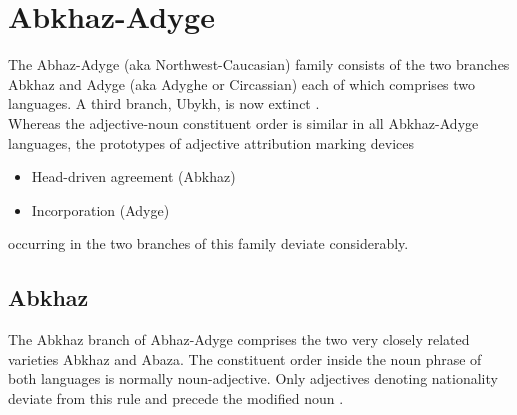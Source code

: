 \section{Abkhaz-Adyge}
The Abhaz-Adyge (aka Northwest-Caucasian) family consists of the two branches Abkhaz and Adyge (aka Adyghe or Circassian) each of which comprises two languages. A third branch, Ubykh, is now extinct \citep[220, 233]{salminen2007}.\\

\noindent Whereas the adjective-noun constituent order is similar in all Abkhaz-Adyge languages, the prototypes of adjective attribution marking devices
\begin{itemize}
\item Head-driven agreement (Abkhaz)
\item Incorporation (Adyge)
\end{itemize}
occurring in the two branches of this family deviate considerably.

\subsection{Abkhaz}
The Abkhaz branch of Abhaz-Adyge comprises the two very closely related varieties Abkhaz and Abaza. The constituent order inside the noun phrase of both languages is normally noun-adjective. Only adjectives denoting nationality deviate from this rule and precede the modified noun \citep[222]{comrie1981}.

